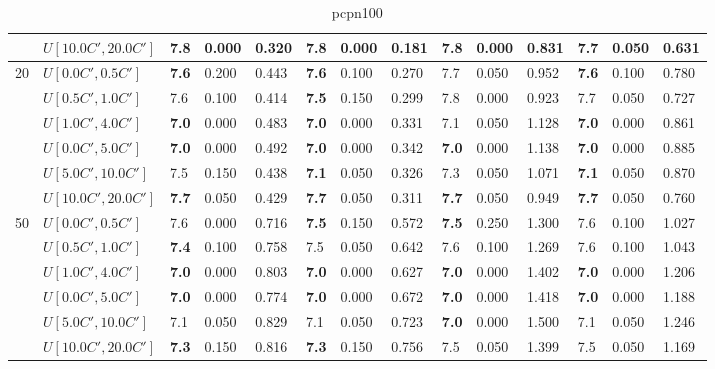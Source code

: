 \begin{table}[h]
{\begin{tabular}{|l|l||l|l|l||l|l|l||l|l|l||l|l|l|}
       & $U[10.0C',20.0C']$ & 7.8 & 0.000 & 0.320 & 7.8 & 0.000 & 0.181 & 7.8 & 0.000 & 0.831 & \textbf{7.7} & 0.050 & 0.631 \\
      \hline\hline
      \multirow{6}{*}{20} & $U[0.0C',0.5C']$ & \textbf{7.6} & 0.200 & 0.443 & \textbf{7.6} & 0.100 & 0.270 & 7.7 & 0.050 & 0.952 & \textbf{7.6} & 0.100 & 0.780 \\
       & $U[0.5C',1.0C']$ & 7.6 & 0.100 & 0.414 & \textbf{7.5} & 0.150 & 0.299 & 7.8 & 0.000 & 0.923 & 7.7 & 0.050 & 0.727 \\
       & $U[1.0C',4.0C']$ & \textbf{7.0} & 0.000 & 0.483 & \textbf{7.0} & 0.000 & 0.331 & 7.1 & 0.050 & 1.128 & \textbf{7.0} & 0.000 & 0.861 \\
       & $U[0.0C',5.0C']$ & \textbf{7.0} & 0.000 & 0.492 & \textbf{7.0} & 0.000 & 0.342 & \textbf{7.0} & 0.000 & 1.138 & \textbf{7.0} & 0.000 & 0.885 \\
       & $U[5.0C',10.0C']$ & 7.5 & 0.150 & 0.438 & \textbf{7.1} & 0.050 & 0.326 & 7.3 & 0.050 & 1.071 & \textbf{7.1} & 0.050 & 0.870 \\
       & $U[10.0C',20.0C']$ & \textbf{7.7} & 0.050 & 0.429 & \textbf{7.7} & 0.050 & 0.311 & \textbf{7.7} & 0.050 & 0.949 & \textbf{7.7} & 0.050 & 0.760 \\
      \hline\hline
      \multirow{6}{*}{50} & $U[0.0C',0.5C']$ & 7.6 & 0.000 & 0.716 & \textbf{7.5} & 0.150 & 0.572 & \textbf{7.5} & 0.250 & 1.300 & 7.6 & 0.100 & 1.027 \\
       & $U[0.5C',1.0C']$ & \textbf{7.4} & 0.100 & 0.758 & 7.5 & 0.050 & 0.642 & 7.6 & 0.100 & 1.269 & 7.6 & 0.100 & 1.043 \\
       & $U[1.0C',4.0C']$ & \textbf{7.0} & 0.000 & 0.803 & \textbf{7.0} & 0.000 & 0.627 & \textbf{7.0} & 0.000 & 1.402 & \textbf{7.0} & 0.000 & 1.206 \\
       & $U[0.0C',5.0C']$ & \textbf{7.0} & 0.000 & 0.774 & \textbf{7.0} & 0.000 & 0.672 & \textbf{7.0} & 0.000 & 1.418 & \textbf{7.0} & 0.000 & 1.188 \\
       & $U[5.0C',10.0C']$ & 7.1 & 0.050 & 0.829 & 7.1 & 0.050 & 0.723 & \textbf{7.0} & 0.000 & 1.500 & 7.1 & 0.050 & 1.246 \\
       & $U[10.0C',20.0C']$ & \textbf{7.3} & 0.150 & 0.816 & \textbf{7.3} & 0.150 & 0.756 & 7.5 & 0.050 & 1.399 & 7.5 & 0.050 & 1.169 \\
      \hline
      \end{tabular}
      }
      \caption{pcpn100}
      \label{tab:pcpn100ILPVariant}\end{table}
      
